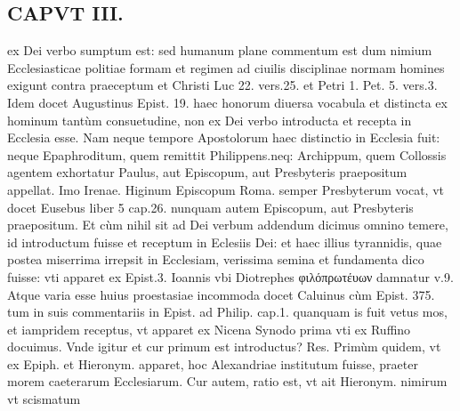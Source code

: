 \documentclass{article}
\begin{document}
\begin{pages}
\section*{CAPVT  III. }\pstart ex Dei verbo sumptum est: sed humanum plane commentum est dum nimium Ecclesiasticae politiae formam et regimen ad ciuilis disciplinae normam homines exigunt contra praeceptum et Christi Luc 22. vers.25. et Petri 1. Pet. 5. vers.3. Idem docet Augustinus Epist. 19. haec honorum diuersa vocabula et distincta ex hominum tantùm consuetudine, non ex Dei verbo introducta et recepta in Ecclesia esse. Nam neque tempore Apostolorum haec distinctio in Ecclesia fuit: neque Epaphroditum, quem remittit Philippens.neq: Archippum, quem Collossis agentem exhortatur Paulus, aut Episcopum, aut Presbyteris praepositum appellat. Imo Irenae. Higinum Episcopum Roma. semper Presbyterum vocat, vt docet Eusebus liber 5 cap.26. nunquam autem Episcopum, aut Presbyteris praepositum. Et cùm nihil sit ad Dei verbum addendum dicimus omnino temere, id introductum fuisse et receptum in Eclesiis Dei: et haec illius tyrannidis, quae postea miserrima irrepsit in Ecclesiam, verissima semina et fundamenta dico fuisse: vti apparet ex Epist.3. Ioannis vbi Diotrephes φιλόπρωτέυων damnatur v.9. Atque  varia esse huius proestasiae incommoda docet Caluinus cùm Epist. 375. tum in suis commentariis in Epist. ad Philip. cap.1. quanquam is fuit vetus mos, et iampridem receptus, vt apparet ex Nicena Synodo prima vti ex Ruffino docuimus. Vnde igitur et cur primum est introductus? Res. Primùm quidem, vt ex Epiph. et Hieronym. apparet, hoc Alexandriae institutum fuisse, praeter morem caeterarum Ecclesiarum. Cur autem, ratio est, vt ait Hieronym. nimirum vt scismatum  \pend

\end{pages}
\end{document}
